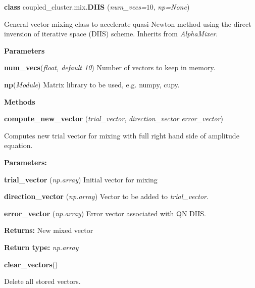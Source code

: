\begin{tcolorbox}
    {\selectfont
    \textbf{class} coupled\_cluster.mix.\textbf{DIIS}
    (\emph{num\_vecs=$10$}, \emph{np=None})

    \vspace{1em}
    General vector mixing class to accelerate quasi-Newton method using the 
    direct inversion of iterative space (DIIS) scheme. Inherits from 
    \emph{AlphaMixer}.
        
    \vspace{1em}
    \textbf{Parameters}

    \hspace{2em}\textbf{num\_vecs}(\emph{float, default 10}) 
        Number of vectors to keep in memory.

    \hspace{2em}\textbf{np}(\emph{Module})
        Matrix library to be used, e.g. numpy, cupy.

    \vspace{1em} 
    \textbf{Methods}

    \hspace{2em} \textbf{compute\_new\_vector}
        (\emph{trial\_vector}, \emph{direction\_vector} \emph{error\_vector})

        \begin{adjustwidth}{4em}{}
        Computes new trial vector for mixing with full right hand side of amplitude 
        equation.

        \textbf{Parameters:} 

            \hspace{1.5em}\textbf{trial\_vector} (\emph{np.array}) 
            Initial vector for mixing

            \hspace{1.5em}\textbf{direction\_vector} (\emph{np.array})
            Vector to be added to \emph{trial\_vector}.

            \hspace{1.5em}\textbf{error\_vector} (\emph{np.array})
            Error vector associated with QN DIIS. 

        \textbf{Returns:} New mixed vector

        \textbf{Return type:} \emph{np.array}
        \end{adjustwidth}

    \hspace{2em} \textbf{clear\_vectors}()
        \begin{adjustwidth}{4em}{}
        Delete all stored vectors.
        \end{adjustwidth}
    } 
\end{tcolorbox}
